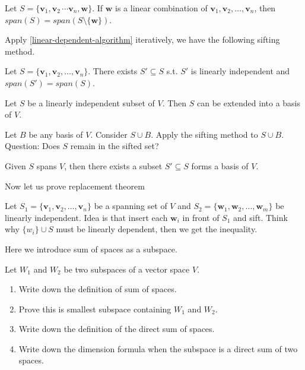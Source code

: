 \documentclass[12pt]{article}
\begin{document}
\begin{theorem}
    Let $S=\{\mathbf{v}_1, \mathbf{v}_2\, \cdots \mathbf{v}_n, \mathbf{w}\}$.
    If $\mathbf{w}$ is a linear combination of $\mathbf{v}_1, \mathbf{v}_2, \ldots, \mathbf{v}_n$,
    then $span(S)=span(S\setminus\{\mathbf{w}\})$.
\end{theorem}


Apply \eqref{linear-dependent-algorithm} iteratively, we have the following sifting method.
\begin{theorem}
    Let $S=\{\mathbf{v}_1,\mathbf{v}_2,\ldots,\mathbf{v}_n\}$.
    There exists $S' \subseteq S$ s.t. $S'$ is linearly independent and $span(S')=span(S)$. 
\end{theorem}

\begin{theorem}
    Let $S$ be a linearly independent subset of $V$.
    Then $S$ can be extended into a basis of $V$.
\end{theorem}

\begin{pfbox}
    Let $B$ be any basis of $V$. Consider $S\cup B$. Apply the sifting method to $S\cup B$.
    Question: Does $S$ remain in the sifted set?
\end{pfbox}


\begin{theorem}
Given $S$ spans $V$, then there exists a subset $S'\subseteq S$ forms a basis of $V$.
\end{theorem}


Now let us prove replacement theorem
\begin{pfbox}
Let  $S_1=\{\mathbf{v}_1,\mathbf{v}_2, \ldots ,\mathbf{v}_n\}$ be a spanning set of $V$ and
    $S_2=\{\mathbf{w}_1, \mathbf{w}_2, \ldots ,\mathbf{w}_m\}$ be linearly independent.
Idea is that insert each $\mathbf{w}_i$ in front of $S_1$ and sift.
Think why $\{w_i\}\cup S$ must be linearly dependent, then we get the inequality.
\end{pfbox}

Here we introduce sum of spaces as a subspace.
\begin{exercise}
Let $W_1$ and $W_2$ be two subspaces of a vector space $V$.
\begin{enumerate}
    \item Write down the definition of sum of spaces.
    \item Prove this is smallest subspace containing $W_1$ and $W_2$.
    \item Write down the definition of the direct sum of spaces.
    \item Write down the dimension formula when the subspace is a direct sum of two spaces.
\end{enumerate}
\end{exercise}
\end{document}
